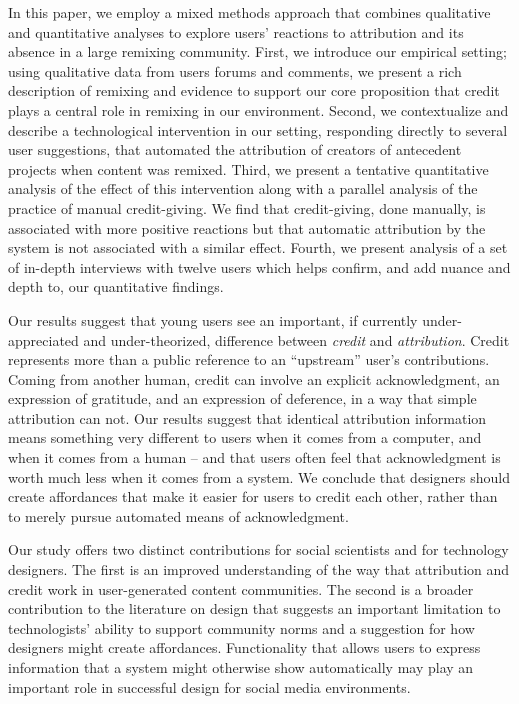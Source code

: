In this paper, we employ a mixed methods approach that combines
qualitative and quantitative analyses to explore users' reactions to
attribution and its absence in a large remixing community. First, we
introduce our empirical setting; using qualitative data from users
forums and comments, we present a rich description of remixing and
evidence to support our core proposition that credit plays a central
role in remixing in our environment. Second, we contextualize and
describe a technological intervention in our setting, responding
directly to several user suggestions, that automated the attribution
of creators of antecedent projects when content was remixed. Third, we
present a tentative quantitative analysis of the effect of this
intervention along with a parallel analysis of the practice of manual
credit-giving. We find that credit-giving, done manually, is
associated with more positive reactions but that automatic attribution
by the system is not associated with a similar effect. Fourth, we
present analysis of a set of in-depth interviews with twelve users
which helps confirm, and add nuance and depth to, our quantitative
findings.

Our results suggest that young users see an important, if currently
under-appreciated and under-theorized, difference between
\emph{credit} and \emph{attribution}. Credit represents more than a
public reference to an ``upstream'' user's contributions. Coming from
another human, credit can involve an explicit acknowledgment, an
expression of gratitude, and an expression of deference, in a way that
simple attribution can not. Our results suggest that identical
attribution information means something very different to users when
it comes from a computer, and when it comes from a human -- and that
users often feel that acknowledgment is worth much less when it comes
from a system. We conclude that designers should create affordances
that make it easier for users to credit each other, rather than to
merely pursue automated means of acknowledgment.

Our study offers two distinct contributions for social scientists and
for technology designers.  The first is an improved understanding of
the way that attribution and credit work in user-generated content
communities. The second is a broader contribution to the literature on
design that suggests an important limitation to technologists' ability to
support community norms and a suggestion for how designers might
create affordances. Functionality that allows users to
express information that a system might otherwise show automatically
may play an important role in successful design for social media
environments.



